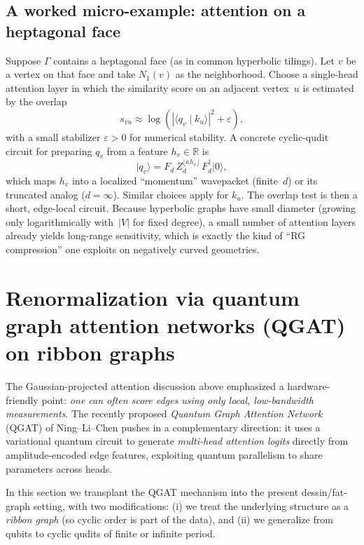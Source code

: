 \documentclass[11pt,oneside]{amsbook}
\numberwithin{equation}{section}
\theoremstyle{plain}
\theoremstyle{definition}
\theoremstyle{remark}
\newcommand{\ket}[1]{\lvert #1 \rangle}
\begin{document}
\subsection{A worked micro-example: attention on a heptagonal face}
Suppose $\Gamma$ contains a heptagonal face (as in common hyperbolic tilings).
Let $v$ be a vertex on that face and take $N_1(v)$ as the neighborhood.
Choose a single-head attention layer in which the similarity score on an adjacent vertex~$u$ is
estimated by the overlap
\[
  s_{vu} \approx \log\!\left(|\langle q_v\mid k_u\rangle|^2 + \varepsilon\right),
\]
with a small stabilizer $\varepsilon>0$ for numerical stability.
A concrete cyclic-qudit circuit for preparing $q_v$ from a feature $h_v\in\mathbb{R}$ is
\[
  \ket{q_v} = F_d\,Z_d^{\lfloor \kappa h_v\rfloor}\,F_d^\dagger \ket{0},
\]
which maps $h_v$ into a localized ``momentum'' wavepacket (finite~$d$) or its truncated analog
($d=\infty$). Similar choices apply for $k_u$. The overlap test is then a short, edge-local circuit.
Because hyperbolic graphs have small diameter (growing only logarithmically with~$|V|$ for fixed degree),
a small number of attention layers already yields long-range sensitivity, which is exactly the kind of
``RG compression'' one exploits on negatively curved geometries.


\section{Renormalization via quantum graph attention networks (QGAT) on ribbon graphs}
\label{sec:qgat_renorm}

The Gaussian-projected attention discussion above emphasized a hardware-friendly point:
\emph{one can often score edges using only local, low-bandwidth measurements}.
The recently proposed \emph{Quantum Graph Attention Network} (QGAT) of Ning--Li--Chen \cite{Ning2025QGAT}
pushes in a complementary direction: it uses a variational quantum circuit to generate
\emph{multi-head attention logits} directly from amplitude-encoded edge features, exploiting quantum parallelism
to share parameters across heads.

In this section we transplant the QGAT mechanism into the present dessin/fat-graph setting, with two modifications:
(i) we treat the underlying structure as a \emph{ribbon graph} (so cyclic order is part of the data), and
(ii) we generalize from qubits to cyclic qudits of finite or infinite period.
\end{document}
